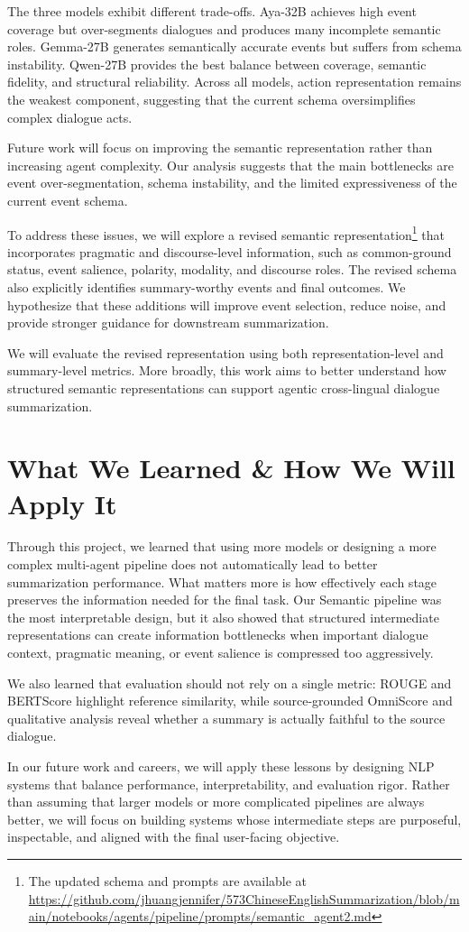\documentclass[11pt]{article}
\begin{document}
The three models exhibit different trade-offs. Aya-32B achieves high event coverage but over-segments dialogues and produces many incomplete semantic roles. Gemma-27B generates semantically accurate events but suffers from schema instability. Qwen-27B provides the best balance between coverage, semantic fidelity, and structural reliability. Across all models, action representation remains the weakest component, suggesting that the current schema oversimplifies complex dialogue acts.


Future work will focus on improving the semantic representation rather than increasing agent complexity. Our analysis suggests that the main bottlenecks are event over-segmentation, schema instability, and the limited expressiveness of the current event schema.

To address these issues, we will explore a revised semantic representation\footnote{The updated schema and prompts are available at \url{https://github.com/jhuangjennifer/573ChineseEnglishSummarization/blob/main/notebooks/agents/pipeline/prompts/semantic_agent2.md}} that incorporates pragmatic and discourse-level information, such as common-ground status, event salience, polarity, modality, and discourse roles. The revised schema also explicitly identifies summary-worthy events and final outcomes. We hypothesize that these additions will improve event selection, reduce noise, and provide stronger guidance for downstream summarization.

We will evaluate the revised representation using both representation-level and summary-level metrics. More broadly, this work aims to better understand how structured semantic representations can support agentic cross-lingual dialogue summarization.


\section{What We Learned \& How We Will Apply It}
Through this project, we learned that using more models or designing a more complex multi-agent pipeline does not automatically lead to better summarization performance. What matters more is how effectively each stage preserves the information needed for the final task. Our Semantic pipeline was the most interpretable design, but it also showed that structured intermediate representations can create information bottlenecks when important dialogue context, pragmatic meaning, or event salience is compressed too aggressively. 

We also learned that evaluation should not rely on a single metric: ROUGE and BERTScore highlight reference similarity, while source-grounded OmniScore and qualitative analysis reveal whether a summary is actually faithful to the source dialogue. 

In our future work and careers, we will apply these lessons by designing NLP systems that balance performance, interpretability, and evaluation rigor. Rather than assuming that larger models or more complicated pipelines are always better, we will focus on building systems whose intermediate steps are purposeful, inspectable, and aligned with the final user-facing objective.




\end{document}
